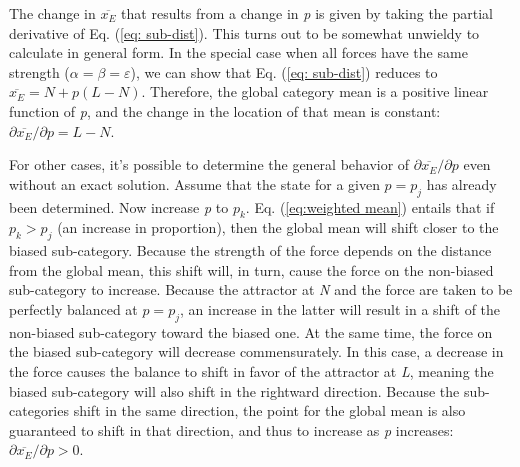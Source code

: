 The change in $\overline{x_{E}}$ that results from a change in \emph{p}
is given by taking the partial derivative of Eq. (\ref{eq: sub-dist}).
This turns out to be somewhat unwieldy to calculate in general form.
In the special case when all forces have the same strength ($\alpha=\beta=\varepsilon$),
we can show that Eq. (\ref{eq: sub-dist}) reduces to $\overline{x_{E}}=N+p(L-N)$.
Therefore, the global category mean is a positive linear function
of \emph{p}, and the change in the location of that mean is constant:
${\partial\overline{x_{E}}}/{\partial p}=L-N$. 

For other cases, it's possible to determine the general behavior of
${\partial\overline{x_{E}}}/{\partial p}$ even without an exact
solution. Assume that the  state for a given $p=p_{j}$
has already been determined. Now increase \emph{p} to $p_{k}$. Eq.
(\ref{eq:weighted mean}) entails that if $p_{k}>p_{j}$ (an increase
in  proportion), then the global mean will shift closer to the
biased sub-category. Because the strength of the  force
depends on the distance from the global mean, this shift will, in
turn, cause the  force on the non-biased sub-category
to increase. Because the attractor at \emph{N} and the 
force are taken to be perfectly balanced at $p=p_{j}$, an increase
in the latter will result in a shift of the non-biased sub-category
toward the biased one. At the same time, the  force on
the biased sub-category will decrease commensurately. In this case,
a decrease in the  force causes the balance to shift in
favor of the attractor at \emph{L}, meaning the biased sub-category
will also shift in the rightward direction. Because the sub-categories
shift in the same direction, the  point for the global
mean is also guaranteed to shift in that direction, and thus to increase
as \emph{p} increases: ${\partial\overline{x_{E}}}/{\partial p}>0$. 

